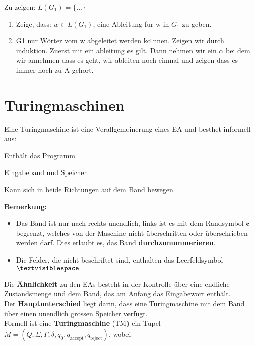 \documentclass[11pt]{article}
\begin{document}
Zu zeigen: $L(G_1) = \{...\}$
\begin{enumerate}
	\item Zeige, dass: $w \in L(G_1)$, eine Ableitung fur w in $G_1$ zu geben.
	\item G1 nur W{\"o}rter vom w abgeleitet werden ko ̈nnen. Zeigen wir durch induktion. Zuerst mit ein ableitung es gilt. Dann nehmen wir ein $\alpha$ bei dem wir annehmen dass es geht, wir ableiten noch einmal und zeigen dass es immer noch zu A gehort.
\end{enumerate}

\section{Turingmaschinen}

Eine Turingmaschine ist eine Verallgemeinerung eines EA und besthet informell aus:
\begin{description}[labelindent=16pt,style=multiline,leftmargin=4.5cm, noitemsep]
	\item[Kontrolle:] Enth{\"a}lt das Programm
	\item[Unendliches Band:] Eingabeband und Speicher
	\item[Lese-/Schreibkopf:] Kann sich in beide Richtungen auf dem Band bewegen
\end{description}

\textbf{Bemerkung:} \begin{itemize}
	\item Das Band ist nur nach rechts unendlich, links ist es mit dem Randsymbol $\cent$ begrenzt, welches von der Maschine nicht {\"u}berschritten oder {\"u}berschrieben werden darf. Dies erlaubt es, das Band \textbf{durchzunummerieren}.
	\item Die Felder, die nicht beschriftet sind, enthalten das Leerfeldsymbol $\textvisiblespace$
\end{itemize}

Die \textbf{{\"A}hnlichkeit} zu den EAs besteht in der Kontrolle {\"u}ber eine endliche Zustandsmenge und dem Band, das am Anfang das Eingabewort enth{\"a}lt. \\
Der \textbf{Hauptunterschied} liegt darin, dass eine Turingmaschine mit dem Band {\"u}ber einen unendlich grossen Speicher verf{\"u}gt. \\

Formell ist eine \textbf{Turingmaschine} (TM) ein Tupel $M = (Q, \Sigma, \Gamma, \delta, q_0, q_\text{accept}, q_\text{reject})$, wobei
\end{document}
